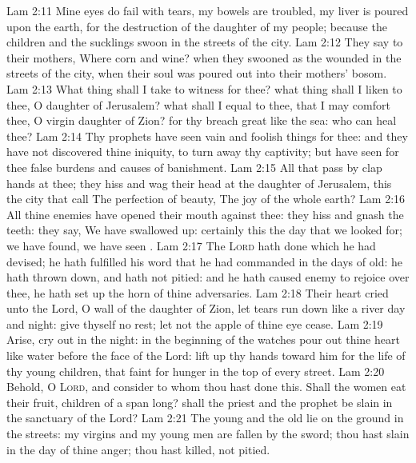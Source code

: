 \vs Lam 2:11 Mine eyes do fail with tears, my bowels are troubled, my liver is poured upon the earth, for the destruction of the daughter of my people; because the children and the sucklings swoon in the streets of the city.
\vs Lam 2:12 They say to their mothers, Where  corn and wine? when they swooned as the wounded in the streets of the city, when their soul was poured out into their mothers' bosom.
\vs Lam 2:13 What thing shall I take to witness for thee? what thing shall I liken to thee, O daughter of Jerusalem? what shall I equal to thee, that I may comfort thee, O virgin daughter of Zion? for thy breach  great like the sea: who can heal thee?
\vs Lam 2:14 Thy prophets have seen vain and foolish things for thee: and they have not discovered thine iniquity, to turn away thy captivity; but have seen for thee false burdens and causes of banishment.
\vs Lam 2:15 All that pass by clap  hands at thee; they hiss and wag their head at the daughter of Jerusalem,  this the city that  call The perfection of beauty, The joy of the whole earth?
\vs Lam 2:16 All thine enemies have opened their mouth against thee: they hiss and gnash the teeth: they say, We have swallowed  up: certainly this  the day that we looked for; we have found, we have seen .
\vs Lam 2:17 The \textsc{Lord} hath done  which he had devised; he hath fulfilled his word that he had commanded in the days of old: he hath thrown down, and hath not pitied: and he hath caused  enemy to rejoice over thee, he hath set up the horn of thine adversaries.
\vs Lam 2:18 Their heart cried unto the Lord, O wall of the daughter of Zion, let tears run down like a river day and night: give thyself no rest; let not the apple of thine eye cease.
\vs Lam 2:19 Arise, cry out in the night: in the beginning of the watches pour out thine heart like water before the face of the Lord: lift up thy hands toward him for the life of thy young children, that faint for hunger in the top of every street.
\vs Lam 2:20 Behold, O \textsc{Lord}, and consider to whom thou hast done this. Shall the women eat their fruit,  children of a span long? shall the priest and the prophet be slain in the sanctuary of the Lord?
\vs Lam 2:21 The young and the old lie on the ground in the streets: my virgins and my young men are fallen by the sword; thou hast slain  in the day of thine anger; thou hast killed,  not pitied.
